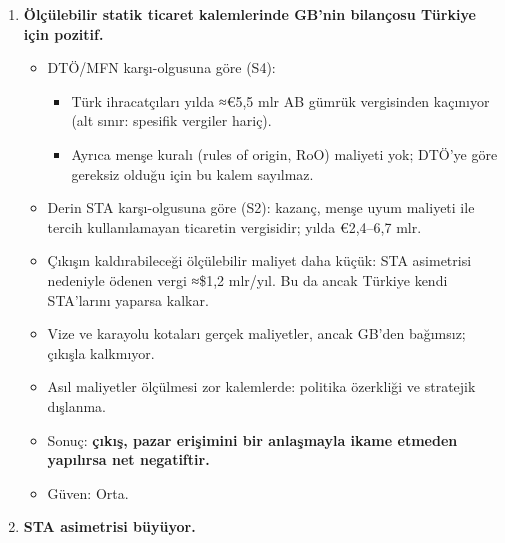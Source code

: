 \begin{enumerate}
  \begin{itemize}
  \tightlist
  \item
    Tahminler geniş bir aralıkta: GSYH etkisi sıfırdan (çekim modelleri) +\%0,72'ye (BKP 2016 CGE) ve kişi başı GSYH'de +\%13'e (sentetik kontrol) kadar uzanıyor.
  \item
    En güncel çekim çalışması etkinin ilk on yılda pozitif olup sonra kaybolduğunu buluyor (Dursun 2023).
  \item
    \etiketV{} Güven: Orta.
  \end{itemize}
\item
  \textbf{Ölçülebilir statik ticaret kalemlerinde GB'nin bilançosu Türkiye için pozitif.}

  \begin{itemize}
  \tightlist
  \item
    DTÖ/MFN karşı-olgusuna göre (S4):

    \begin{itemize}
    \tightlist
    \item
      Türk ihracatçıları yılda ≈€5,5 mlr AB gümrük vergisinden kaçınıyor (alt sınır: spesifik vergiler hariç).
    \item
      Ayrıca menşe kuralı (rules of origin, RoO) maliyeti yok; DTÖ'ye göre gereksiz olduğu için bu kalem sayılmaz.
    \end{itemize}
  \item
    Derin STA karşı-olgusuna göre (S2): kazanç, menşe uyum maliyeti ile tercih kullanılamayan ticaretin vergisidir; yılda €2,4--6,7 mlr.
  \item
    Çıkışın kaldırabileceği ölçülebilir maliyet daha küçük: STA asimetrisi nedeniyle ödenen vergi ≈\$1,2 mlr/yıl. Bu da ancak Türkiye kendi STA'larını yaparsa kalkar.
  \item
    Vize ve karayolu kotaları gerçek maliyetler, ancak GB'den bağımsız; çıkışla kalkmıyor.
  \item
    Asıl maliyetler ölçülmesi zor kalemlerde: politika özerkliği ve stratejik dışlanma.
  \item
    Sonuç: \textbf{çıkış, pazar erişimini bir anlaşmayla ikame etmeden yapılırsa net negatiftir.}
  \item
    \etiketT{} Güven: Orta.
  \end{itemize}
\item
  \textbf{STA asimetrisi büyüyor.}


\end{enumerate}
